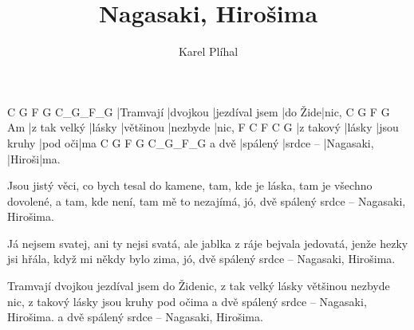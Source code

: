 \documentclass{song}
\title{Nagasaki, Hirošima}
\author{Karel Plíhal}
\begin{document}
\strophe
C         G        F              G       C_G_F_G
|Tramvají |dvojkou |jezdíval jsem |do Žide|nic,
C            G      F         G        Am
|z tak velký |lásky |většinou |nezbyde |nic,
F         C      F           C       G
|z takový |lásky |jsou kruhy |pod oči|ma
      C        G         F          G      C_G_F_G
a dvě |spálený |srdce -- |Nagasaki, |Hiroši|ma.
\endstrophe

\strophe*
Jsou jistý věci, co bych tesal do kamene,
tam, kde je láska, tam je všechno dovolené,
a tam, kde není, tam mě to nezajímá,
jó, dvě spálený srdce -- Nagasaki, Hirošima.
\endstrophe

\strophe*
Já nejsem svatej, ani ty nejsi svatá,
ale jablka z ráje bejvala jedovatá,
jenže hezky jsi hřála, když mi někdy bylo zima,
jó, dvě spálený srdce -- Nagasaki, Hirošima.
\endstrophe

\strophe*
Tramvají dvojkou jezdíval jsem do Židenic,
z tak velký lásky většinou nezbyde nic,
z takový lásky jsou kruhy pod očima
a dvě spálený srdce -- Nagasaki, Hirošima.
a dvě spálený srdce -- Nagasaki, Hirošima.
\endstrophe
\end{document}
